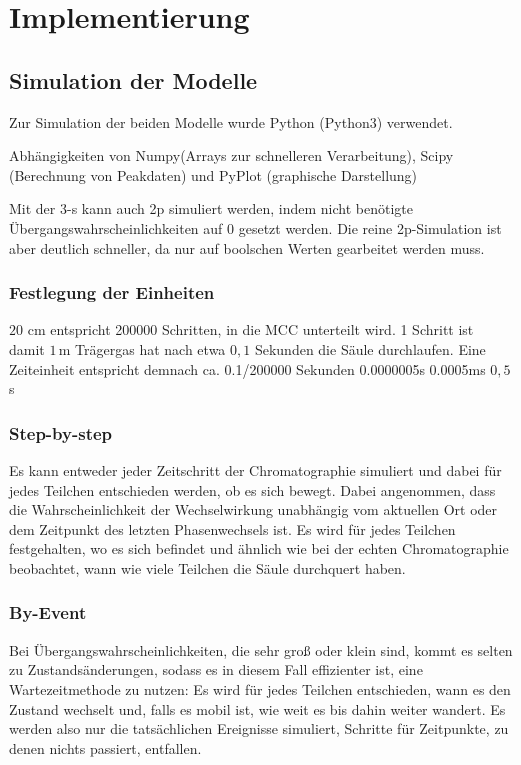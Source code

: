 
\chapter{Implementierung}
\label{chapter:imp}

\section{Simulation der Modelle}
Zur Simulation der beiden Modelle wurde Python (Python3) verwendet.

Abhängigkeiten von Numpy(Arrays zur schnelleren Verarbeitung), Scipy (Berechnung von Peakdaten) und PyPlot (graphische Darstellung) 

Mit der 3-s kann auch 2p simuliert werden, indem nicht benötigte Übergangswahrscheinlichkeiten auf 0 gesetzt werden. Die reine 2p-Simulation ist aber deutlich schneller, da nur auf boolschen Werten gearbeitet werden muss.

\subsection{Festlegung der Einheiten}
$20$ cm entspricht 200000 Schritten, in die MCC unterteilt wird.
1 Schritt ist damit $1$\,\textmu m
Trägergas hat nach etwa $0,1$ Sekunden die Säule durchlaufen.
Eine Zeiteinheit entspricht demnach ca. 0.1/200000 Sekunden 0.0000005s 0.0005ms $0,5$\,\textmu s


\subsection{Step-by-step}
Es kann entweder jeder Zeitschritt der Chromatographie simuliert und dabei für jedes Teilchen entschieden werden, ob es sich bewegt. Dabei angenommen, dass die Wahrscheinlichkeit der Wechselwirkung unabhängig vom aktuellen Ort oder dem Zeitpunkt des letzten Phasenwechsels ist. Es wird für jedes Teilchen festgehalten, wo es sich befindet und ähnlich wie bei der echten Chromatographie beobachtet, wann wie viele Teilchen die Säule durchquert haben. 

\subsection{By-Event}
Bei Übergangswahrscheinlichkeiten, die sehr groß oder klein sind, kommt es selten zu Zustandsänderungen, sodass es in diesem Fall effizienter ist, eine Wartezeitmethode zu nutzen: Es wird für jedes Teilchen entschieden, wann es den Zustand wechselt und, falls es mobil ist, wie weit es bis dahin weiter wandert. Es werden also nur die tatsächlichen Ereignisse simuliert, Schritte für Zeitpunkte, zu denen nichts passiert, entfallen.

